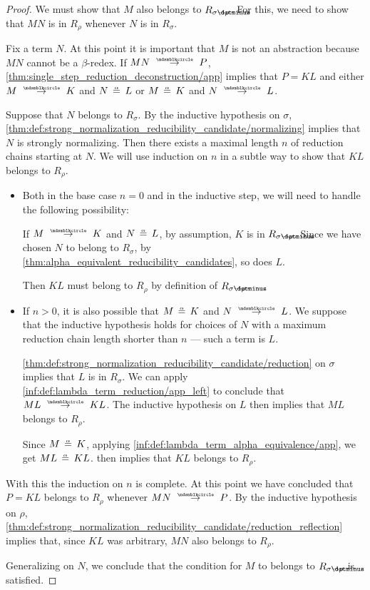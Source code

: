 \begin{proof}
  We must show that \( M \) also belongs to \( R_{\sigma \synimplies \rho} \). For this, we need to show that \( MN \) is in \( R_\rho \) whenever \( N \) is in \( R_\sigma \).

  Fix a term \( N \). At this point it is important that \( M \) is not an abstraction because \( MN \) cannot be a \( \beta \)-redex. If \( MN \pred P \), \cref{thm:single_step_reduction_deconstruction/app} implies that \( P = KL \) and either \( M \pred K \) and \( N \aequiv L \) or \( M \aequiv K \) and \( N \pred L \).

  Suppose that \( N \) belongs to \( R_\sigma \). By the inductive hypothesis on \( \sigma \), \ref{thm:def:strong_normalization_reducibility_candidate/normalizing} implies that \( N \) is strongly normalizing. Then there exists a maximal length \( n \) of reduction chains starting at \( N \). We will use induction on \( n \) in a subtle way to show that \( KL \) belongs to \( R_\rho \).

  \begin{itemize}
    \item Both in the base case \( n = 0 \) and in the inductive step, we will need to handle the following possibility:

    If \( M \pred K \) and \( N \aequiv L \), by assumption, \( K \) is in \( R_{\sigma \synimplies \rho} \). Since we have chosen \( N \) to belong to \( R_\sigma \), by \cref{thm:alpha_equivalent_reducibility_candidates}, so does \( L \).

    Then \( KL \) must belong to \( R_\rho \) by definition of \( R_{\sigma \synimplies \rho} \).

    \item If \( n > 0 \), it is also possible that \( M \aequiv K \) and \( N \pred L \). We suppose that the inductive hypothesis holds for choices of \( N \) with a maximum reduction chain length shorter than \( n \) --- such a term is \( L \).

    \ref{thm:def:strong_normalization_reducibility_candidate/reduction} on \( \sigma \) implies that \( L \) is in \( R_\sigma \). We can apply \ref{inf:def:lambda_term_reduction/app_left} to conclude that \( ML \pred KL \). The inductive hypothesis on \( L \) then implies that \( ML \) belongs to \( R_\rho \).

    Since \( M \aequiv K \), applying \ref{inf:def:lambda_term_alpha_equivalence/app}, we get \( ML \aequiv KL \).  then implies that \( KL \) belongs to \( R_\rho \).
  \end{itemize}

  With this the induction on \( n \) is complete. At this point we have concluded that \( P = KL \) belongs to \( R_\rho \) whenever \( MN \pred P \). By the inductive hypothesis on \( \rho \), \ref{thm:def:strong_normalization_reducibility_candidate/reduction_reflection} implies that, since \( KL \) was arbitrary, \( MN \) also belongs to \( R_\rho \).

  Generalizing on \( N \), we conclude that the condition for \( M \) to belongs to \( R_{\sigma \synimplies \rho} \) is satisfied.
\end{proof}

